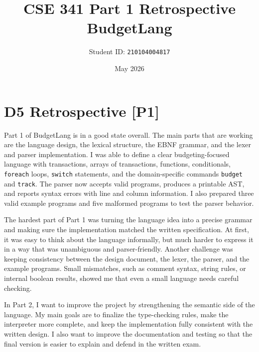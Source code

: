 \documentclass[11pt]{article}
\title{CSE 341 Part 1 Retrospective\\BudgetLang}
\author{Student ID: \texttt{210104004817}}
\date{May 2026}
\begin{document}
\maketitle

\section*{D5 Retrospective [P1]}
Part 1 of BudgetLang is in a good state overall. The main parts that are working are the language design, the lexical structure, the EBNF grammar, and the lexer and parser implementation. I was able to define a clear budgeting-focused language with transactions, arrays of transactions, functions, conditionals, \texttt{foreach} loops, \texttt{switch} statements, and the domain-specific commands \texttt{budget} and \texttt{track}. The parser now accepts valid programs, produces a printable AST, and reports syntax errors with line and column information. I also prepared three valid example programs and five malformed programs to test the parser behavior.

The hardest part of Part 1 was turning the language idea into a precise grammar and making sure the implementation matched the written specification. At first, it was easy to think about the language informally, but much harder to express it in a way that was unambiguous and parser-friendly. Another challenge was keeping consistency between the design document, the lexer, the parser, and the example programs. Small mismatches, such as comment syntax, string rules, or internal boolean results, showed me that even a small language needs careful checking.

In Part 2, I want to improve the project by strengthening the semantic side of the language. My main goals are to finalize the type-checking rules, make the interpreter more complete, and keep the implementation fully consistent with the written design. I also want to improve the documentation and testing so that the final version is easier to explain and defend in the written exam.
\end{document}
